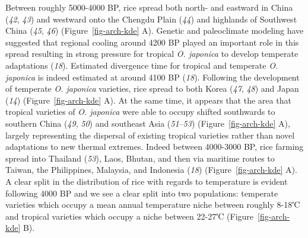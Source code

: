 \documentclass[
  letterpaper,
  DIV=11,
  numbers=noendperiod]{scrartcl}
\begin{document}
Between roughly 5000-4000 BP, rice spread both north- and eastward in
China (\emph{42}, \emph{43}) and westward onto the Chengdu Plain
(\emph{44}) and highlands of Southwest China (\emph{45}, \emph{46})
(Figure~\ref{fig-arch-kde} A). Genetic and paleoclimate modeling have
suggested that regional cooling around 4200 BP played an important role
in this spread resulting in strong pressure for tropical \emph{O.
japonica} to develop temperate adaptations (\emph{18}). Estimated
divergence time for tropical and temperate \emph{O. japonica} is indeed
estimated at around 4100 BP (\emph{18}). Following the development of
temperate \emph{O. japonica} varieties, rice spread to both Korea
(\emph{47}, \emph{48}) and Japan (\emph{14}) (Figure~\ref{fig-arch-kde}
A). At the same time, it appears that the area that tropical varieties
of \emph{O. japonica} were able to occupy shifted southwards to southern
China (\emph{49}, \emph{50}) and southeast Asia (\emph{51}--\emph{53})
(Figure~\ref{fig-arch-kde} A), largely representing the dispersal of
existing tropical varieties rather than novel adaptations to new thermal
extremes. Indeed between 4000-3000 BP, rice farming spread into Thailand
(\emph{53}), Laos, Bhutan, and then via maritime routes to Taiwan, the
Philippines, Malaysia, and Indonesia (\emph{18})
(Figure~\ref{fig-arch-kde} A). A clear split in the distribution of rice
with regards to temperature is evident following 4000 BP and we see a
clear split into two populations: temperate varieties which occupy a
mean annual temperature niche between roughly 8-18℃ and tropical
varieties which occupy a niche between 22-27℃ (Figure~\ref{fig-arch-kde}
B).
\end{document}

